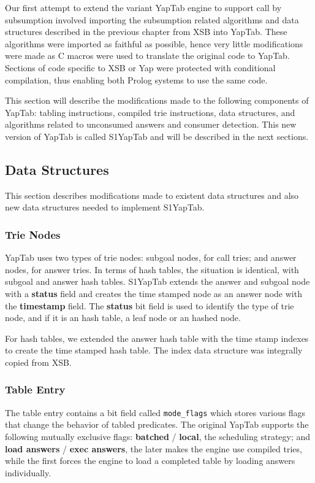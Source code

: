Our first attempt to extend the variant YapTab engine to support call by subsumption
involved importing the subsumption related algorithms and data structures described in
the previous chapter from XSB into YapTab. These algorithms were imported as faithful as possible,
hence very little modifications were made as C macros were used to translate the original
code to YapTab. Sections of code specific to XSB or Yap were protected with conditional
compilation, thus enabling both Prolog systems to use the same code.

This section will describe the modifications made to the following components of YapTab:
tabling instructions, compiled trie instructions, data structures, and algorithms
related to unconsumed answers and consumer detection.
This new version of YapTab is called S1YapTab and will be described in the next sections.

\subsection{Data Structures}

This section describes modifications made to existent data structures and also new 
data structures needed to implement S1YapTab.

\subsubsection{Trie Nodes}

YapTab uses two types of trie nodes: subgoal nodes, for call tries; and answer nodes, for
answer tries. In terms of hash tables, the situation is identical, with subgoal and answer
hash tables. S1YapTab extends the answer and subgoal node with a \textbf{status} field and
creates the time stamped node as an answer node with the \textbf{timestamp} field.
The \textbf{status} bit field is used to identify the type of trie node, and if it is
an hash table, a leaf node or an hashed node.

For hash tables, we extended the answer hash table with
the time stamp indexes to create the time stamped hash table.
The index data structure was integrally copied from XSB.

\subsubsection{Table Entry}

The table entry contains a bit field called \texttt{mode\_flags} which stores various flags
that change the behavior of tabled predicates. The original YapTab supports the
following mutually exclusive flags: \textbf{batched} / \textbf{local}, the scheduling strategy;
and \textbf{load answers} / \textbf{exec answers}, the later makes the engine use compiled tries,
while the first forces the engine to load a completed table by loading answers individually.

